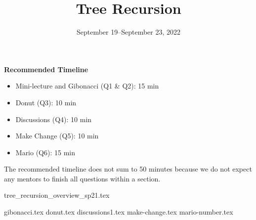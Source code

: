 \documentclass{exam}
\title{Tree Recursion}
\date{September 19--September 23, 2022}
\begin{document}
\maketitle

\begin{meta}
\begin{blocksection}
\textbf{Recommended Timeline}
\begin{itemize}
    \item Mini-lecture and Gibonacci (Q1 \& Q2): 15 min
    \item Donut (Q3): 10 min
    \item Discussions (Q4): 10 min
    \item Make Change (Q5): 10 min
    \item Mario (Q6): 15 min
\end{itemize}
The recommended timeline does not sum to 50 minutes because we do not expect any mentors to finish all questions within a section.
\end{blocksection}
\end{meta}

{tree_recursion_overview_sp21.tex}

\begin{questions}
{gibonacci.tex}
{donut.tex}
{discussions1.tex}
{make-change.tex}
{mario-number.tex}


\end{questions}
\end{document}
